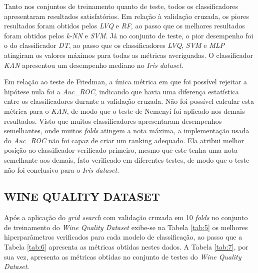 \documentclass[journal]{IEEEtran}
\begin{document}
Tanto nos conjuntos de treinamento quanto de teste, todos os classificadores apresentaram resultados satisfatórios. Em relação à validação cruzada, os piores resultados foram obtidos pelos \textit{LVQ} e \textit{RF}, ao passo que os melhores resultados foram obtidos pelos \textit{k-NN} e \textit{SVM}. Já no conjunto de teste, o pior desempenho foi o do classificador \textit{DT}, ao passo que os classificadores \textit{LVQ}, \textit{SVM} e \textit{MLP} atingiram os valores máximos para todas as métricas averiguadas. O classificador \textit{KAN} apresentou um desempenho mediano no \textit{Iris dataset}.

Em relação ao teste de Friedman, a única métrica em que foi possível rejeitar a hipótese nula foi a \textit{Auc\_ROC}, indicando que havia uma diferença estatística entre os classificadores durante a validação cruzada. Não foi possível calcular esta métrica para o \textit{KAN}, de modo que o teste de Nemenyi foi aplicado nos demais resultados. Visto que muitos classificadores apresentaram desempenhos semelhantes, onde muitos \textit{folds} atingem a nota máxima, a implementação usada do \textit{Auc\_ROC} não foi capaz de criar um ranking adequado. Ela atribui melhor posição ao classificador verificado primeiro, mesmo que este tenha uma nota semelhante aos demais, fato verificado em diferentes testes, de modo que o teste não foi conclusivo para o \textit{Iris dataset}.

\subsection{WINE QUALITY DATASET}

Após a aplicação do \textit{grid search} com validação cruzada em 10 \textit{folds} no conjunto de treinamento do \textit{Wine Quality Dataset} exibe-se na Tabela \ref{tab:5} os melhores hiperparâmetros verificados para cada modelo de classificação, ao passo que a Tabela \ref{tab:6} apresenta as métricas obtidas nestes dados. A Tabela \ref{tab:7}, por sua vez, apresenta as métricas obtidas no conjunto de testes do \textit{Wine Quality Dataset}.
\end{document}
